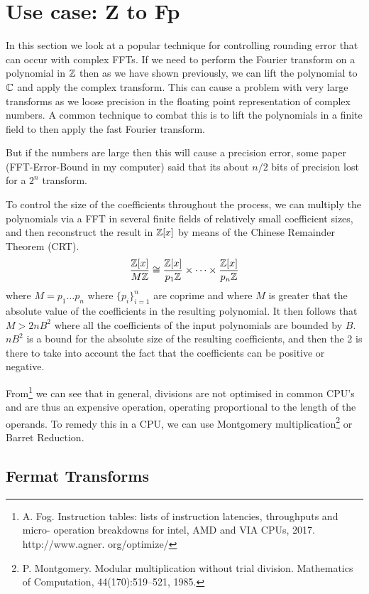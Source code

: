 \section{Use case: Z to Fp}\label{sec:Z-Fp}

In this section we look at a popular technique for controlling rounding error that can occur with complex FFTs. If we need to perform the Fourier transform on a polynomial in ${\mathbb Z}$ then as we have shown previously, we can lift the polynomial to $\mathbb{C}$ and apply the complex transform. This can cause a problem with very large transforms as we loose precision in the floating point representation of complex numbers. A common technique to combat this is to lift the polynomials in a finite field to then apply the fast Fourier transform.

But if the numbers are large then this will cause a precision error, some paper (FFT-Error-Bound in my computer) said that its about $n / 2$ bits of precision lost for a $2^n$ transform. 

To control the size of the coefficients throughout the process, we can multiply the polynomials via a FFT in several finite fields of relatively small coefficient sizes, and then reconstruct the result in ${\mathbb Z}[x]$ by means of the Chinese Remainder Theorem (CRT).
\[
    \frac{{\mathbb Z}[x]}{M{\mathbb Z}} \cong \frac{{\mathbb Z}[x]}{p_1{\mathbb Z}} \times \cdots \times \frac{{\mathbb Z}[x]}{p_n{\mathbb Z}}
\]
where $M = p_1 \ldots p_n$ where $\{p_i\}_{i=1}^n$ are coprime and where $M$ is greater that the absolute value of the coefficients in the resulting polynomial. It then follows that $M > 2nB^2$ where all the coefficients of the input polynomials are bounded by $B$. $nB^2$ is a bound for the absolute size of the resulting coefficients, and then the 2 is there to take into account the fact that the coefficients can be positive or negative.

From\footnote{A. Fog. Instruction tables: lists of instruction latencies, throughputs and micro- operation breakdowns for intel, AMD and VIA CPUs, 2017. http://www.agner. org/optimize/} we can see that in general, divisions are not optimised in common CPU's and are thus an expensive operation, operating proportional to the length of the operands. To remedy this in a CPU, we can use Montgomery multiplication\footnote{P. Montgomery. Modular multiplication without trial division. Mathematics of Computation, 44(170):519–521, 1985.} or Barret Reduction.


\subsection{Fermat Transforms}
\label{subsec:fermat-transforms}

